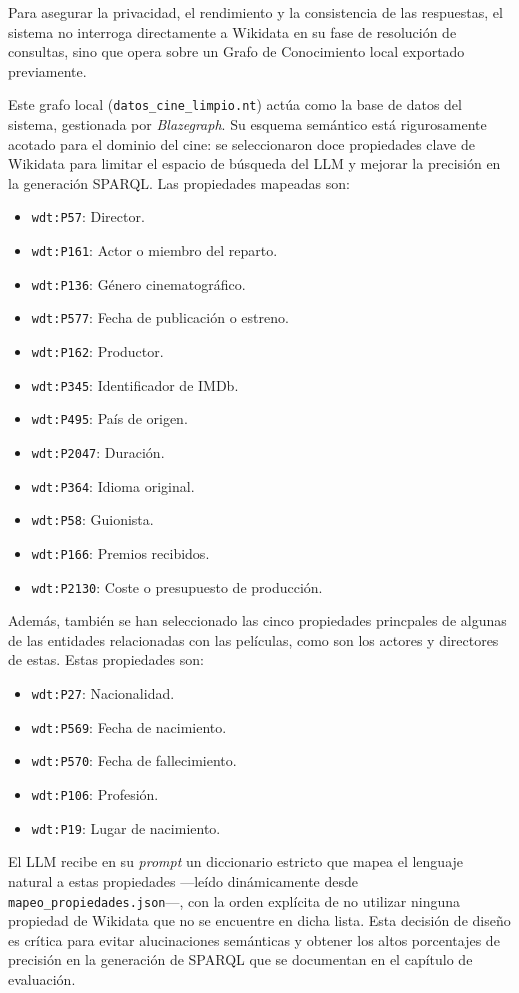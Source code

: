 Para asegurar la privacidad, el rendimiento y la consistencia de las respuestas, el sistema no interroga directamente a Wikidata en su fase de resolución de consultas, sino que opera sobre un Grafo de Conocimiento local exportado previamente.

Este grafo local (\texttt{datos\_cine\_limpio.nt}) actúa como la base de datos del sistema, gestionada por \textit{Blazegraph}. Su esquema semántico está rigurosamente acotado para el dominio del cine: se seleccionaron doce propiedades clave de Wikidata para limitar el espacio de búsqueda del LLM y mejorar la precisión en la generación SPARQL. Las propiedades mapeadas son:

\begin{itemize}
    \item \texttt{wdt:P57}: Director.
    \item \texttt{wdt:P161}: Actor o miembro del reparto.
    \item \texttt{wdt:P136}: Género cinematográfico.
    \item \texttt{wdt:P577}: Fecha de publicación o estreno.
    \item \texttt{wdt:P162}: Productor.
    \item \texttt{wdt:P345}: Identificador de IMDb.
    \item \texttt{wdt:P495}: País de origen.
    \item \texttt{wdt:P2047}: Duración.
    \item \texttt{wdt:P364}: Idioma original.
    \item \texttt{wdt:P58}: Guionista.
    \item \texttt{wdt:P166}: Premios recibidos.
    \item \texttt{wdt:P2130}: Coste o presupuesto de producción.
\end{itemize}

Además, también se han seleccionado las cinco propiedades princpales de algunas de las entidades relacionadas con las películas, como son los actores y directores de estas. Estas propiedades son:


\begin{itemize}
    \item \texttt{wdt:P27}: Nacionalidad.
    \item \texttt{wdt:P569}: Fecha de nacimiento.
    \item \texttt{wdt:P570}: Fecha de fallecimiento.
    \item \texttt{wdt:P106}: Profesión.
    \item \texttt{wdt:P19}: Lugar de nacimiento.
\end{itemize}

El LLM recibe en su \textit{prompt} un diccionario estricto que mapea el lenguaje natural a estas propiedades —leído dinámicamente desde \texttt{mapeo\_propiedades.json}—, con la orden explícita de no utilizar ninguna propiedad de Wikidata que no se encuentre en dicha lista. Esta decisión de diseño es crítica para evitar alucinaciones semánticas y obtener los altos porcentajes de precisión en la generación de SPARQL que se documentan en el capítulo de evaluación.